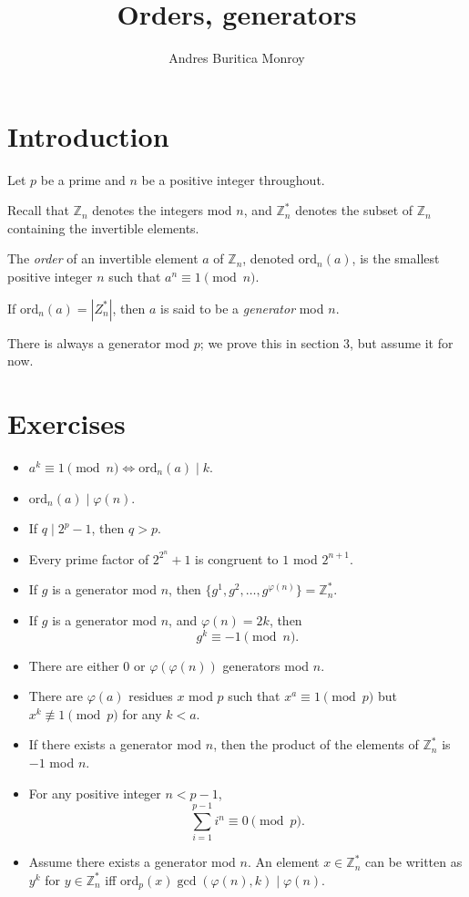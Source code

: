 \documentclass{article}
\title{Orders, generators}
\author{Andres Buritica Monroy}
\date{}
\newcommand\Zz{\mathbb{Z}}
\newcommand\ord{\mathrm{ord}}
\begin{document}
\maketitle
\section{Introduction}
  Let $p$ be a prime and $n$ be a positive integer throughout.

  Recall that $\Zz_n$ denotes the integers mod $n$, and $\Zz_n^*$ denotes the
  subset of $\Zz_n$ containing the invertible elements.

  The \emph{order} of an invertible element $a$ of $\Zz_n$, denoted $\ord_n(a)$,
  is the smallest positive integer $n$ such that $a^n\equiv 1\pmod n$.

  If $\ord_n(a)=|Z_n^*|$, then $a$ is said to be a \emph{generator} mod $n$.

  There is always a generator mod $p$; we prove this in section 3, but assume it for
  now.
\section{Exercises}
\begin{itemize}
  \item $a^k\equiv 1\pmod n \iff \ord_n(a)\mid k$.
  \item $\ord_n(a)\mid\varphi(n)$.
  \item If $q\mid 2^p-1$, then $q>p$.
  \item Every prime factor of $2^{2^n}+1$ is congruent to $1$ mod $2^{n+1}$.
  \item If $g$ is a generator mod $n$, then
    $\{g^1,g^2,\ldots,g^{\varphi(n)}\}=\mathbb Z_n^*$.
  \item If $g$ is a generator mod $n$, and $\varphi(n)=2k$, then
    \[g^k\equiv -1\pmod n.\]
  \item There are either $0$ or $\varphi(\varphi(n))$ generators mod $n$.
  \item There are $\varphi(a)$ residues $x$ mod $p$
    such that $x^a\equiv 1\pmod p$ but $x^k\not\equiv 1\pmod p$ for any $k<a$.
  \item If there exists a generator mod $n$, then the product of the elements of
    $\Zz_n^*$ is $-1$ mod $n$.
  \item For any positive integer $n<p-1$,
    \[\sum_{i=1}^{p-1} i^n\equiv 0\pmod p.\]
  \item Assume there exists a generator mod $n$.
    An element $x\in\Zz_n^*$ can be written as $y^k$ for $y\in\Zz_n^*$ iff
    $\ord_p(x)\gcd(\varphi(n),k)\mid \varphi(n)$.
\end{itemize}
\end{document}
